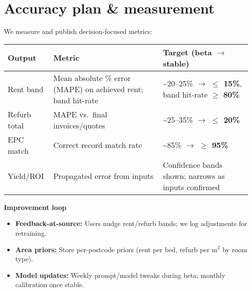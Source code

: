 \documentclass[11pt,a4paper]{article}
\begin{document}
\section*{Accuracy plan \& measurement}
We measure and publish decision-focused metrics:
\begin{center}
\begin{tabularx}{\linewidth}{@{}p{3.2cm} X X@{}}
\toprule
\textbf{Output} & \textbf{Metric} & \textbf{Target (beta $\rightarrow$ stable)}\\
\midrule
Rent band & Mean absolute \% error (MAPE) on achieved rent; band hit-rate & \textasciitilde 20--25\% $\rightarrow$ \textbf{$\leq$ 15\%}, band hit-rate $\geq$ \textbf{80\%}\\
Refurb total & MAPE vs.\ final invoices/quotes & \textasciitilde 25--35\% $\rightarrow$ \textbf{$\leq$ 20\%}\\
EPC match & Correct record match rate & \textasciitilde 85\% $\rightarrow$ \textbf{$\geq$ 95\%}\\
Yield/ROI & Propagated error from inputs & Confidence bands shown; narrows as inputs confirmed\\
\bottomrule
\end{tabularx}
\end{center}

\noindent\textbf{Improvement loop}
\begin{itemize}
  \item \textbf{Feedback-at-source:} Users nudge rent/refurb bands; we log adjustments for retraining.
  \item \textbf{Area priors:} Store per-postcode priors (rent per bed, refurb per m$^2$ by room type).
  \item \textbf{Model updates:} Weekly prompt/model tweaks during beta; monthly calibration once stable.
\end{itemize}
\end{document}
